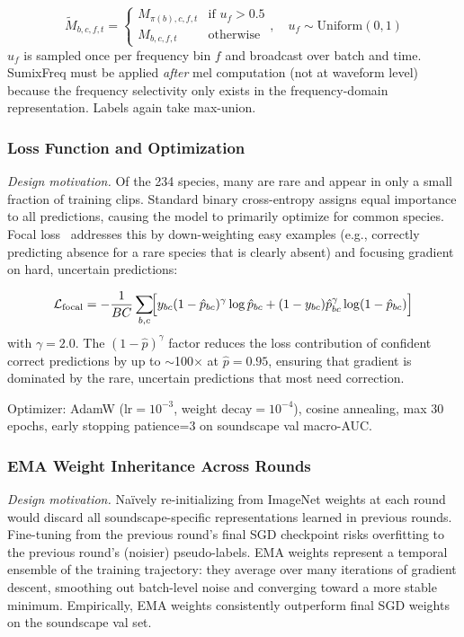 \documentclass[journal]{IEEEtran}
\begin{document}
\begin{equation}
  \tilde{M}_{b,c,f,t} = \begin{cases} M_{\pi(b),c,f,t} & \text{if } u_f > 0.5 \\ M_{b,c,f,t} & \text{otherwise} \end{cases}, \quad u_f \sim \mathrm{Uniform}(0,1)
\end{equation}
$u_f$ is sampled once per frequency bin $f$ and broadcast over batch and time.
SumixFreq must be applied \emph{after} mel computation (not at waveform level) because the frequency selectivity only exists in the frequency-domain representation.
Labels again take max-union.

\subsubsection{Loss Function and Optimization}

\emph{Design motivation.}
Of the 234 species, many are rare and appear in only a small fraction of training clips.
Standard binary cross-entropy assigns equal importance to all predictions, causing the model to primarily optimize for common species.
Focal loss~\cite{lin2017focal} addresses this by down-weighting easy examples (e.g., correctly predicting absence for a rare species that is clearly absent) and focusing gradient on hard, uncertain predictions:

\begin{equation}
  \mathcal{L}_\text{focal} = -\frac{1}{BC}\sum_{b,c}\!\Bigl[y_{bc}(1-\hat{p}_{bc})^\gamma\log\hat{p}_{bc} + (1-y_{bc})\hat{p}_{bc}^\gamma\log(1-\hat{p}_{bc})\Bigr]
\end{equation}
with $\gamma=2.0$.
The $(1-\hat{p})^\gamma$ factor reduces the loss contribution of confident correct predictions by up to $\sim$100$\times$ at $\hat{p}=0.95$, ensuring that gradient is dominated by the rare, uncertain predictions that most need correction.

Optimizer: AdamW (lr$=10^{-3}$, weight decay$=10^{-4}$), cosine annealing, max 30 epochs, early stopping patience=3 on soundscape val macro-AUC.

\subsubsection{EMA Weight Inheritance Across Rounds}

\emph{Design motivation.}
Na\"{i}vely re-initializing from ImageNet weights at each round would discard all soundscape-specific representations learned in previous rounds.
Fine-tuning from the previous round's final SGD checkpoint risks overfitting to the previous round's (noisier) pseudo-labels.
EMA weights represent a temporal ensemble of the training trajectory: they average over many iterations of gradient descent, smoothing out batch-level noise and converging toward a more stable minimum.
Empirically, EMA weights consistently outperform final SGD weights on the soundscape val set.
\end{document}
